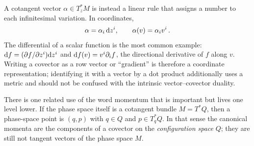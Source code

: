 A cotangent vector $\alpha\in T_z^*M$ is instead a linear rule that assigns a
number to each infinitesimal variation.  In coordinates,
\begin{equation}
    \alpha = \alpha_i\,\text{d} z^i,
    \qquad
    \alpha(v) = \alpha_i v^i\,.
\end{equation}
The differential of a scalar function is the most common example:
$\text{d} f = (\partial f/\partial z^i)\text{d} z^i$ and
$\text{d} f(v) = v^i\partial_i f$, the directional derivative of $f$ along $v$.
Writing a covector as a row vector or ``gradient'' is therefore a coordinate
representation; identifying it with a vector by a dot product additionally
uses a metric and should not be confused with the intrinsic vector--covector
duality.

There is one related use of the word momentum that is important but lives one
level lower.  If the phase space itself is a cotangent bundle $M = T^*Q$, then
a phase-space point is $(q,p)$ with $q\in Q$ and $p\in T_q^*Q$.  In that sense
the canonical momenta are the components of a covector on the
\emph{configuration space} $Q$; they are still not tangent vectors of the
phase space $M$.


